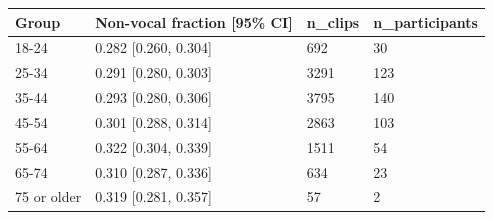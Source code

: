 \begin{tabular}{llll}
\toprule
Group & Non-vocal fraction [95\% CI] & n\_clips & n\_participants \\
\midrule
18-24 & 0.282 [0.260, 0.304] & 692 & 30 \\
25-34 & 0.291 [0.280, 0.303] & 3291 & 123 \\
35-44 & 0.293 [0.280, 0.306] & 3795 & 140 \\
45-54 & 0.301 [0.288, 0.314] & 2863 & 103 \\
55-64 & 0.322 [0.304, 0.339] & 1511 & 54 \\
65-74 & 0.310 [0.287, 0.336] & 634 & 23 \\
75 or older & 0.319 [0.281, 0.357] & 57 & 2 \\
\bottomrule
\end{tabular}
